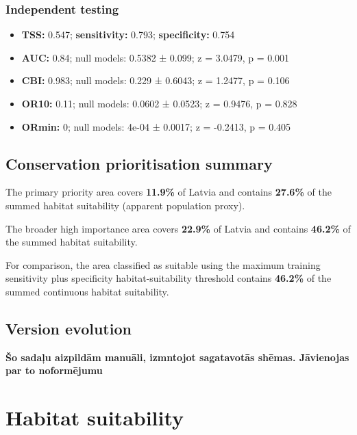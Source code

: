\documentclass[
  openany]{book}
\providecommand{\tightlist}{%
  \setlength{\itemsep}{0pt}\setlength{\parskip}{0pt}}
\providecommand{\tightlist}{%
  \setlength{\itemsep}{0pt}%
  \setlength{\parskip}{0pt}%
}
\begin{document}
\subsubsection*{Independent testing}\label{independent-testing-11}

\begin{itemize}
\tightlist
\item
  \textbf{TSS:} 0.547; \textbf{sensitivity:} 0.793; \textbf{specificity:} 0.754
\item
  \textbf{AUC:} 0.84; null models: 0.5382 ± 0.099; z = 3.0479, p = 0.001
\item
  \textbf{CBI:} 0.983; null models: 0.229 ± 0.6043; z = 1.2477, p = 0.106
\item
  \textbf{OR10:} 0.11; null models: 0.0602 ± 0.0523; z = 0.9476, p = 0.828
\item
  \textbf{ORmin:} 0; null models: 4e-04 ± 0.0017; z = -0.2413, p = 0.405
\end{itemize}

\subsection*{Conservation prioritisation summary}\label{conservation-prioritisation-summary-11}

The primary priority area covers \textbf{11.9\%} of Latvia and contains \textbf{27.6\%} of the summed habitat suitability (apparent population proxy).

The broader high importance area covers \textbf{22.9\%} of Latvia and contains \textbf{46.2\%} of the summed habitat suitability.

For comparison, the area classified as suitable using the maximum training sensitivity plus specificity habitat-suitability threshold contains \textbf{46.2\%} of the summed continuous habitat suitability.

\subsection*{Version evolution}\label{version-evolution-11}

\textbf{Šo sadaļu aizpildām manuāli, izmntojot sagatavotās shēmas. Jāvienojas par to noformējumu}

\section*{Habitat suitability}\label{habitat-suitability-11}
\end{document}
